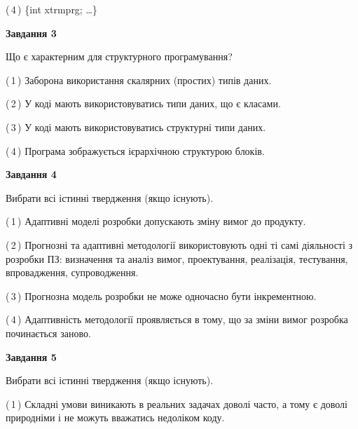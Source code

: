 \documentclass[10pt, ukrainian]{article}
\begin{document}
{\begin {large}
(\,4\,) \{int xtrmprg; …\}%


{\begin {center}\textbf{Завдання 3}\end {center}}\par
Що є характерним для структурного програмування?\par
\vspace{2mm}



(\,1\,) Заборона використання скалярних (простих) типів даних. %



(\,2\,) У коді мають використовуватись типи даних, що є класами. %



(\,3\,) У коді мають використовуватись структурні типи даних. %



(\,4\,) Програма зображується ієрархічною структурою блоків.%


{\begin {center}\textbf{Завдання 4}\end {center}}\par
Вибрати всі істинні твердження (якщо існують).\par
\vspace{2mm}



(\,1\,) Адаптивні моделі розробки допускають зміну вимог до продукту. %



(\,2\,) Прогнозні та адаптивні методології використовують одні ті самі діяльності з розробки ПЗ: визначення та аналіз вимог, проектування, реалізація, тестування, впровадження, супроводження. %



(\,3\,) Прогнозна модель розробки не може одночасно бути інкрементною. %



(\,4\,) Адаптивність методології проявляється в тому, що за зміни вимог розробка починається заново. %


{\begin {center}\textbf{Завдання 5}\end {center}}\par
Вибрати всі істинні твердження (якщо існують).\par
\vspace{2mm}



(\,1\,) Складні умови виникають в реальних задачах доволі часто, а тому є доволі природніми і не можуть вважатись недоліком коду. %




\end{large}}
\end{document}
